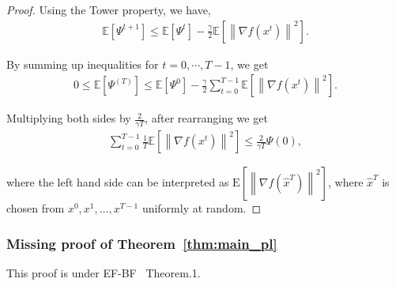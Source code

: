 \documentclass{article} %
\newcommand{\algname}[1]{{\sf\green\relscale{0.90}#1}\xspace}
\newcommand{\eqdef}{\coloneqq}
\theoremstyle{plain}
\theoremstyle{definition}
\theoremstyle{remark}
\newcommand{\green}{\color{mydarkgreen}}
\newcommand{\sqnorm}[1]{\left\| #1 \right\|^2}
\newcommand{\Exp}[1]{\mathbb{E}\!\left[ #1 \right]}
\begin{document}
\begin{proof}
   Using the Tower property, we have,
   \begin{align*}
      \Exp{\Psi^{t+1}} \leq \Exp{\Psi^t} - \frac{\gamma}{2}\Exp{\sqnorm{\nabla f(x^t)}}.
   \end{align*}

   By summing up inequalities for $t=0, \cdots, T-1$, we get 
   \begin{align*}
      0 \leq \Exp{\Psi^(T)} \leq \Exp{\Psi^0} - \frac{\gamma}{2} \sum_{t=0}^{T-1} \Exp{\sqnorm{\nabla f(x^t)}}.
   \end{align*}

   Multiplying both sides by $\frac{2}{\gamma T}$, after rearranging we get
   \begin{align*}
      \sum_{t=0}^{T-1} \frac{1}{T}\Exp{\sqnorm{\nabla f(x^t)}} \leq \frac{2}{\gamma T} \Psi(0),
   \end{align*}

   where the left hand side can be interpreted as $\mathrm{E}\left[\left\|\nabla f\left(\hat{x}^{T}\right)\right\|^{2}\right]$, where $\hat{x}^{T}$ is chosen from $x^{0}, x^{1}, \ldots, x^{T-1}$ uniformly at random.

   \end{proof}

   \subsubsection{Missing proof of Theorem~\ref{thm:main_pl}}
   This proof is under \algname{EF-BF}~\cite{condat2022ef} Theorem.1. 
\end{document}
